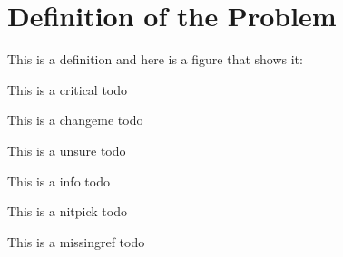 \chapter{Definition of the Problem}

This is a definition and here is a figure that shows it: 

This is a critical todo 

This is a changeme todo 

This is a unsure todo 

This is a info todo 

This is a nitpick todo 

This is a missingref todo 

